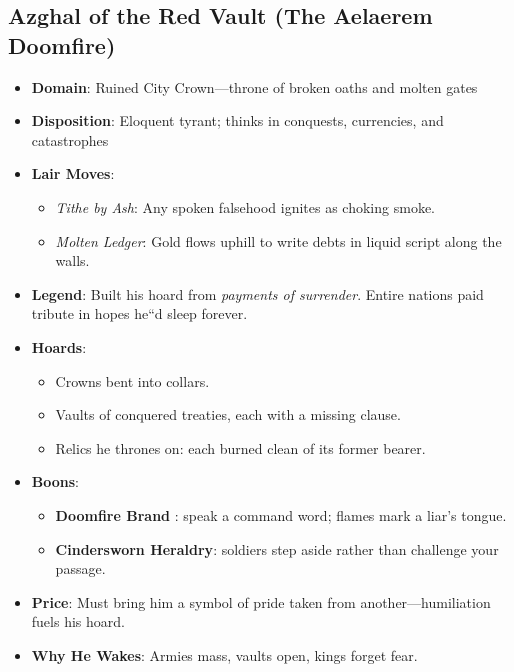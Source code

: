 \documentclass[11pt,letterpaper]{article}
\begin{document}
\subsection{Azghal of the Red Vault (The Aelaerem Doomfire)}
\begin{itemize}
\item \textbf{Domain}: Ruined City Crown---throne of broken oaths and molten gates
\item \textbf{Disposition}: Eloquent tyrant; thinks in conquests, currencies, and catastrophes
\item \textbf{Lair Moves}: 
  \begin{itemize}
  \item \emph{Tithe by Ash}: Any spoken falsehood ignites as choking smoke.
  \item \emph{Molten Ledger}: Gold flows uphill to write debts in liquid script along the walls.
  \end{itemize}
\item \textbf{Legend}: Built his hoard from \emph{payments of surrender}. Entire nations paid tribute in hopes he``d sleep forever.
\item \textbf{Hoards}:
  \begin{itemize}
  \item Crowns bent into collars.
  \item Vaults of conquered treaties, each with a missing clause.
  \item Relics he thrones on: each burned clean of its former bearer.
  \end{itemize}
\item \textbf{Boons}:
  \begin{itemize}
  \item \textbf{Doomfire Brand}  : speak a command word; flames mark a liar's tongue.
  \item \textbf{Cindersworn Heraldry}: soldiers step aside rather than challenge your passage.
  \end{itemize}
\item \textbf{Price}: Must bring him a symbol of pride taken from another---humiliation fuels his hoard.
\item \textbf{Why He Wakes}: Armies mass, vaults open, kings forget fear.
\end{itemize}

\end{document}
